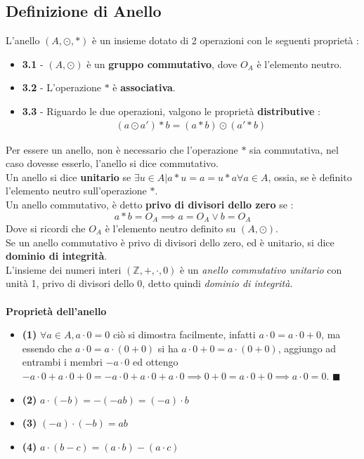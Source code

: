 \documentclass[12pt, letterpaper]{article}
\begin{document}
\subsection{Definizione di Anello}\label{ringDef}
L'anello \((A,\odot,*) \) è un insieme dotato di 2 operazioni con le seguenti proprietà :
\begin{itemize}
    \item \textbf{3.1} - \((A,\odot) \) è un \textbf{gruppo commutativo}, dove \(O_A\) è l'elemento neutro.
    \item \textbf{3.2} - L'operazione \(*\) è \textbf{associativa}.
    \item \textbf{3.3} - Riguardo le due operazioni, valgono le proprietà \textbf{distributive} : 
    \begin{equation}
        \begin{split}
        (a\odot a')*b = (a*b)\odot (a'*b)
        \end{split}
    \end{equation}
\end{itemize} 
Per essere un anello, non è necessario che 
 l'operazione \(*\) sia commutativa, nel caso dovesse esserlo, l'anello si dice commutativo. \\
 Un anello si dice \textbf{unitario} se \(\exists u\in A | a*u=a=u*a \forall a\in A\), ossia, se è definito 
 l'elemento neutro sull'operazione \(*\).
 \\Un anello commutativo, è detto \textbf{privo di divisori dello zero} se :
  \begin{equation}a*b=O_A \implies a=O_A \lor b=O_A\end{equation}Dove si ricordi che \(O_A\) è l'elemento 
  neutro definito su \((A,\odot) \).\\
  Se un anello commutativo è privo di divisori dello zero, ed è unitario, si dice \textbf{dominio di integrità}.\\
  L'insieme dei numeri interi \((\mathbb{Z},+,\cdot,0)\) è un \textit{anello commutativo unitario} con unità 1, privo di divisori
  dello \(0\), detto quindi \textit{dominio di integrità}.
\\ \hphantom{}\\\textbf{Proprietà dell'anello}\\
\begin{itemize}
    \item \textbf{(1)} \(\forall a\in A, a\cdot 0 = 0\) ciò si dimostra facilmente, infatti \(a\cdot 0 = a\cdot 0+0\), ma essendo
    che \(a\cdot 0=a\cdot (0+0)\) si ha \(a\cdot 0 + 0 = a\cdot (0+0)\), aggiungo ad entrambi i membri \(-a\cdot0\)
    ed ottengo \(-a\cdot 0 + a\cdot 0 + 0 = -a\cdot 0 + a\cdot 0 + a\cdot 0 \implies 0+0=a\cdot 0 +0 \implies a\cdot 0=0\). \(\blacksquare\)
    \item \textbf{(2)} \(a\cdot(-b)=-(-ab)=(-a)\cdot b\)
    \item \textbf{(3)} \((-a)\cdot (-b)= ab\)
    \item \textbf{(4)} \(a\cdot(b-c)=(a\cdot b)-(a\cdot c)\)
\end{itemize}
\end{document}
